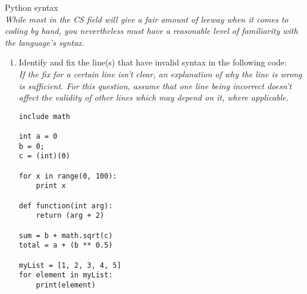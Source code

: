 Python syntax\\
\emph{While most in the CS field will give a fair amount of leeway when it comes to coding by hand,
you nevertheless must have a reasonable level of familiarity with the language's syntax.}

\begin{enumerate}
\item Identify and fix the line(s) that have invalid syntax in the following code:\\
\emph{If the fix for a certain line isn't clear, an explanation of why the line is wrong is sufficient. For this question, assume that one line being incorrect doesn't affect the validity of other lines which may depend on it, where applicable.}
\begin{lstlisting}
include math

int a = 0
b = 0;
c = (int)(0)

for x in range(0, 100):
	print x

def function(int arg):
	return (arg + 2)

sum = b + math.sqrt(c)
total = a + (b ** 0.5)

myList = [1, 2, 3, 4, 5]
for element in myList:
	print(element)


\end{lstlisting}
\end{enumerate}
